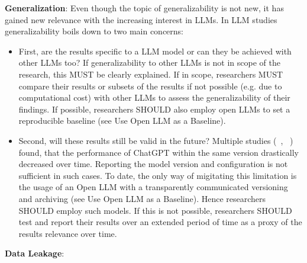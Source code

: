 \textbf{Generalization}:
Even though the topic of generalizability is not new, it has gained new relevance with the increasing interest in LLMs. In LLM studies generalizability boils down to two main concerns: 
\begin{itemize}
  \item First, are the results specific to a LLM model or can they be achieved with other LLMs too? If generalizability to other LLMs is not in scope of the research, this MUST be clearly explained. If in scope, researchers MUST compare their results or subsets of the results if not possible (e.g. due to computational cost) with other LLMs to assess the generalizability of their findings. If possible, researchers SHOULD also employ open LLMs to set a reproducible baseline (see Use Open LLM as a Baseline).
  \item Second, will these results still be valid in the future? Multiple studies (~\cite{DBLP:journals/corr/abs-2307-09009}, ~\cite{doi:10.1148/radiol.232411}) found, that the performance of ChatGPT within the same version drastically decreased over time. Reporting the model version and configuration is not sufficient in such cases. To date, the only way of migitating this limitation is the usage of an Open LLM with a transparently communicated versioning and archiving (see Use Open LLM as a Baseline). Hence researchers SHOULD employ such models. If this is not possible, researchers SHOULD test and report their results over an extended period of time as a proxy of the results relevance over time.
\end{itemize}

\textbf{Data Leakage}:


